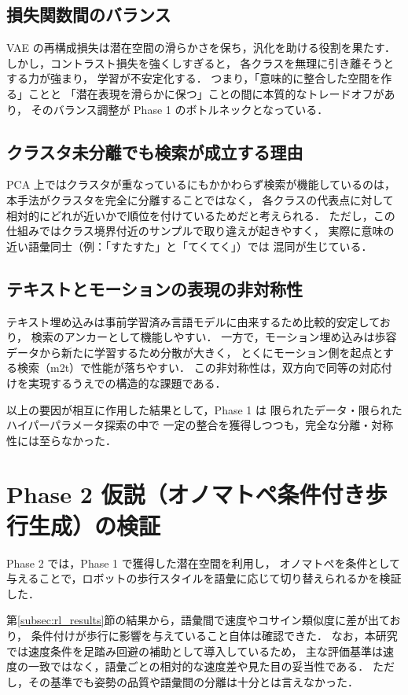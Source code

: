 \subsection{損失関数間のバランス}
VAE の再構成損失は潜在空間の滑らかさを保ち，汎化を助ける役割を果たす．
しかし，コントラスト損失を強くしすぎると，
各クラスを無理に引き離そうとする力が強まり，
学習が不安定化する．
つまり，「意味的に整合した空間を作る」ことと
「潜在表現を滑らかに保つ」ことの間に本質的なトレードオフがあり，
そのバランス調整が Phase 1 のボトルネックとなっている．

\subsection{クラスタ未分離でも検索が成立する理由}
PCA 上ではクラスタが重なっているにもかかわらず検索が機能しているのは，
本手法がクラスタを完全に分離することではなく，
各クラスの代表点に対して相対的にどれが近いかで順位を付けているためだと考えられる．
ただし，この仕組みではクラス境界付近のサンプルで取り違えが起きやすく，
実際に意味の近い語彙同士（例：「すたすた」と「てくてく」）では
混同が生じている．

\subsection{テキストとモーションの表現の非対称性}
テキスト埋め込みは事前学習済み言語モデルに由来するため比較的安定しており，
検索のアンカーとして機能しやすい．
一方で，モーション埋め込みは歩容データから新たに学習するため分散が大きく，
とくにモーション側を起点とする検索（m2t）で性能が落ちやすい．
この非対称性は，双方向で同等の対応付けを実現するうえでの構造的な課題である．

以上の要因が相互に作用した結果として，Phase 1 は
限られたデータ・限られたハイパーパラメータ探索の中で
一定の整合を獲得しつつも，完全な分離・対称性には至らなかった．

\section{Phase 2 仮説（オノマトペ条件付き歩行生成）の検証}
\label{sec:rl_discussion}

Phase 2 では，Phase 1 で獲得した潜在空間を利用し，
オノマトペを条件として与えることで，ロボットの歩行スタイルを語彙に応じて切り替えられるかを検証した．

第\ref{subsec:rl_results}節の結果から，語彙間で速度やコサイン類似度に差が出ており，
条件付けが歩行に影響を与えていること自体は確認できた．
なお，本研究では速度条件を足踏み回避の補助として導入しているため，
主な評価基準は速度の一致ではなく，語彙ごとの相対的な速度差や見た目の妥当性である．
ただし，その基準でも姿勢の品質や語彙間の分離は十分とは言えなかった．

